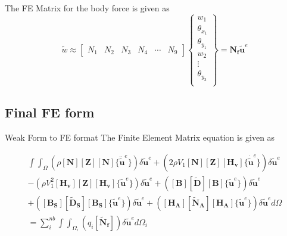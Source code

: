 \documentclass[main.tex]{subfiles}
\begin{document}
The FE Matrix for the body force is given as
\begin{equation}
\tilde{w}    \approx
\begin{bmatrix}
{N}_{1} & N_{2} & N_{3} &{N}_{4} &\cdots & N_{9} 
\end{bmatrix} 
\left\{
\begin{array}{r}
w_1 \\
\theta_{x_1} \\
\theta_{y_1} \\
w_2 \\
\vdots \\
\theta_{y_{3}} \\
\end{array} \right\}=\mathbf{ N_f }\tilde{\mathbf{u}}^e
\end{equation}


\subsection{Final FE form}
Weak Form to FE format
The Finite Element Matrix equation is given as

\begin{equation*}
\begin{split} 
\int \int_\Omega 
\left(
\rho
\left[ \mathbf{N}  \right]
\left[ \mathbf{Z}  \right]
\left[ \mathbf{N}  \right] 
\{ \ddot{\tilde{\mathbf{u}}}^e \}
\right) 
\delta \tilde{\mathbf{u}}^e
+
\left( 
2 \rho V_1
\left[ \mathbf{N}  \right]
\left[ \mathbf{Z}  \right]
\left[ \mathbf{H_v}  \right] 
\{ \dot{\tilde{\mathbf{u}}}^e \}
\right) 
\delta \tilde{\mathbf{u}}^e \\
-
\left( 
 \rho V_1^2
\left[ \mathbf{H_v}  \right]
\left[ \mathbf{Z}  \right]
\left[ \mathbf{H_v}  \right] 
\{\tilde{\mathbf{u}}^e \}
\right) 
\delta \tilde{\mathbf{u}}^e  
+
\left( 
\left[ \mathbf{B}  \right]
\left[ \mathbf{\tilde{D}}  \right]
\left[ \mathbf{B}  \right] 
\{\tilde{\mathbf{u}}^e \}
\right) 
\delta \tilde{\mathbf{u}}^e  \\
+
\left( 
\left[ \mathbf{B_S}  \right]
\left[ \mathbf{\tilde{D}_S}  \right]
\left[ \mathbf{B_S}  \right] 
\{\tilde{\mathbf{u}}^e \}
\right) 
\delta \tilde{\mathbf{u}}^e
+
\left( 
\left[ \mathbf{H_A}  \right]
\left[ \mathbf{\tilde{N}_A}  \right]
\left[ \mathbf{H_A}  \right] 
\{\tilde{\mathbf{u}}^e \}
\right) 
\delta \tilde{\mathbf{u}}^e
d \Omega
   \\
 =   
 \sum_i^{nb}   \int  \int_{\Omega_i} 
\left(  
 q_i 
\left[ \mathbf{\tilde{N}_f}  \right] 
\right)  
\delta \tilde{\mathbf{u}}^e
  d \Omega_i  
\end{split} 
\end{equation*}
\end{document}
